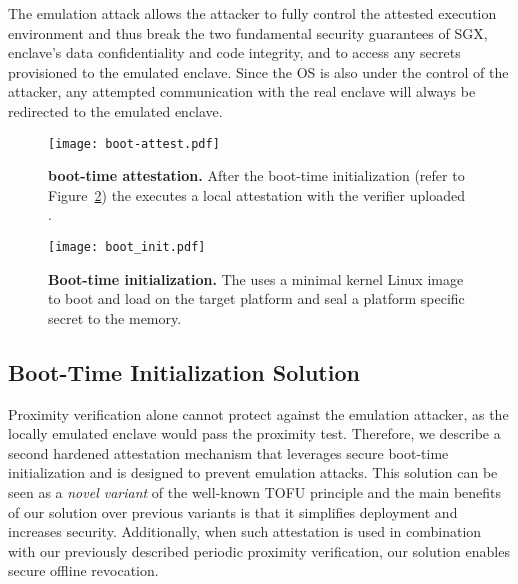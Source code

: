  The emulation attack allows the attacker to fully control the attested execution environment and thus break the two fundamental security guarantees of SGX, enclave's data confidentiality and code integrity, and to access any secrets provisioned to the emulated enclave. Since the OS is also under the control of the attacker, any attempted communication with the real enclave will always be redirected to the emulated enclave.




\begin{figure}[t]
 \centering
\texttt{[image: boot-attest.pdf]}
 \caption{\textbf{\name boot-time attestation.} After the boot-time initialization (refer to Figure~\ref{fig:boot-init}) the \nameclave executes a local attestation with the verifier uploaded \app. 
 }
\figsaver
 \label{fig:boot-attest}
\end{figure}


\begin{figure}[t]
 \centering
    \texttt{[image: boot\_init.pdf]}
 \caption{\textbf{Boot-time initialization.} The \device uses a minimal kernel Linux image to boot and load \nameclave on the target platform and seal a platform specific secret to the \device memory.}
\figsaver
 \label{fig:boot-init}
\end{figure}



\subsection{Boot-Time Initialization Solution}

Proximity verification alone cannot protect against the emulation attacker, as the locally emulated enclave would pass the proximity test. 
%
Therefore, we describe a second hardened attestation mechanism that leverages secure boot-time initialization and is designed to prevent emulation attacks. This solution can be seen as a \emph{novel variant} of the well-known TOFU principle and the main benefits of our solution over previous variants is that it simplifies deployment and increases security. Additionally, when such attestation is used in combination with our previously described periodic proximity verification, our solution enables secure offline revocation.


